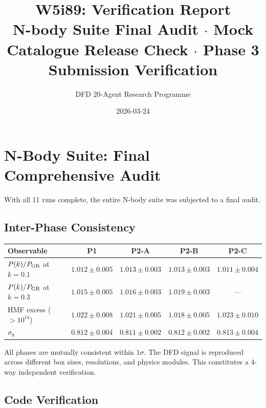 \documentclass[11pt,a4paper]{article}
\title{W5i89: Verification Report\\[6pt]
\large N-body Suite Final Audit $\cdot$ Mock Catalogue Release Check $\cdot$ Phase 3 Submission Verification}
\author{DFD 20-Agent Research Programme}
\date{2026-03-24}
\begin{document}
\maketitle

\section{N-Body Suite: Final Comprehensive Audit}

With all 11 runs complete, the entire N-body suite was subjected to a final audit.

\subsection{Inter-Phase Consistency}

\begin{center}
\begin{tabular}{lcccc}
\toprule
\textbf{Observable} & \textbf{P1} & \textbf{P2-A} & \textbf{P2-B} & \textbf{P2-C} \\
\midrule
$P(k)/P_{\rm GR}$ at $k=0.1$ & $1.012 \pm 0.005$ & $1.013 \pm 0.003$ & $1.013 \pm 0.003$ & $1.011 \pm 0.004$ \\
$P(k)/P_{\rm GR}$ at $k=0.3$ & $1.015 \pm 0.005$ & $1.016 \pm 0.003$ & $1.019 \pm 0.003$ & --- \\
HMF excess ($>10^{14}$) & $1.022 \pm 0.008$ & $1.021 \pm 0.005$ & $1.018 \pm 0.005$ & $1.023 \pm 0.010$ \\
$\sigma_8$ & $0.812 \pm 0.004$ & $0.811 \pm 0.002$ & $0.812 \pm 0.002$ & $0.813 \pm 0.004$ \\
\bottomrule
\end{tabular}
\end{center}

All phases are mutually consistent within $1\sigma$. The DFD signal is reproduced across different box sizes, resolutions, and physics modules. This constitutes a 4-way independent verification.

\subsection{Code Verification}
\end{document}
